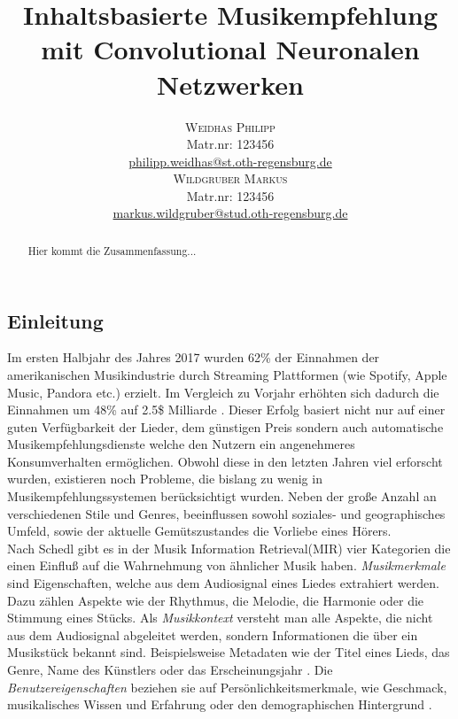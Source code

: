 \documentclass[twosided,a4,10pt]{article}
\title{\vspace{-5mm}%
	\fontsize{20pt}{10pt}\selectfont
	\textbf{Inhaltsbasierte Musikempfehlung mit Convolutional Neuronalen Netzwerken}
}
\author{
	\large\begin{minipage}[t]{0.5\linewidth}
		\begin{center}
			\textsc{Weidhas Philipp}\\[2mm]
			\normalsize	Matr.nr: 123456\\
			\normalsize
			\href{mailto:philipp.weidhas@st.oth-regensburg.de}
			{philipp.weidhas@st.oth-regensburg.de}      
		\end{center}
	\end{minipage}        
	\begin{minipage}[t]{0.5\linewidth}
		\begin{center}
			\textsc{Wildgruber Markus}\\[2mm]
			\normalsize	Matr.nr: 123456\\
			\normalsize
			\href{mailto:markus.wildgruber@stud.oth-regensburg.de}
			{markus.wildgruber@stud.oth-regensburg.de}      
		\end{center}
	\end{minipage}
}
\begin{document}
	
	\maketitle
	\thispagestyle{fancy}
	
	
	
	\begin{multicols}{2}
		
		\begin{abstract}
			\noindent Hier kommt die Zusammenfassung...
		\end{abstract}
		
		
		\section{Einleitung}
		
		Im ersten Halbjahr des Jahres 2017 wurden 62\% der Einnahmen der amerikanischen Musikindustrie durch Streaming Plattformen (wie Spotify, Apple Music, Pandora etc.) erzielt. Im Vergleich zu Vorjahr erhöhten sich dadurch die Einnahmen um 48\% auf 2.5\$ Milliarde \cite{friedlander}\cite{rys}. Dieser Erfolg basiert nicht nur auf einer guten Verfügbarkeit der Lieder, dem günstigen Preis sondern auch automatische Musikempfehlungsdienste welche den Nutzern ein angenehmeres Konsumverhalten ermöglichen.\newline
		Obwohl diese in den letzten Jahren viel erforscht wurden, existieren noch Probleme, die bislang zu wenig in Musikempfehlungssystemen berücksichtigt wurden. Neben der große Anzahl an verschiedenen Stile und Genres, beeinflussen sowohl soziales- und geographisches Umfeld, sowie der aktuelle Gemütszustandes die Vorliebe eines Hörers. \cite{oord}\newline\\
		Nach Schedl \cite{schedl} gibt es in der Musik Information Retrieval(MIR) vier Kategorien die einen Einfluß auf die Wahrnehmung von ähnlicher Musik haben. \textit{Musikmerkmale} sind Eigenschaften, welche aus dem Audiosignal eines Liedes extrahiert werden. Dazu zählen Aspekte wie der Rhythmus, die Melodie, die Harmonie oder die Stimmung eines Stücks.\cite{knees}\newline
		Als \textit{Musikkontext} versteht man alle Aspekte, die nicht aus dem Audiosignal abgeleitet werden, sondern Informationen die über ein Musikstück bekannt sind. Beispielsweise Metadaten wie der Titel eines Lieds, das Genre, Name des Künstlers oder das Erscheinungsjahr \cite{knees}.\newline
		Die \textit{Benutzereigenschaften} beziehen sie auf Persönlichkeitsmerkmale, wie Geschmack, musikalisches Wissen und Erfahrung oder den demographischen Hintergrund \cite{knees}.\newline

\end{multicols}
\end{document}
